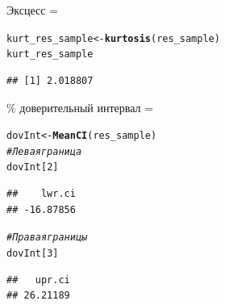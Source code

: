 \documentclass{article}\usepackage[]{graphicx}\usepackage[]{color}
\makeatletter
\newcommand{\hlnum}[1]{\textcolor[rgb]{0.686,0.059,0.569}{#1}}%
\newcommand{\hlcom}[1]{\textcolor[rgb]{0.678,0.584,0.686}{\textit{#1}}}%
\newcommand{\hlstd}[1]{\textcolor[rgb]{0.345,0.345,0.345}{#1}}%
\newcommand{\hlkwb}[1]{\textcolor[rgb]{0.69,0.353,0.396}{#1}}%
\newcommand{\hlkwd}[1]{\textcolor[rgb]{0.737,0.353,0.396}{\textbf{#1}}}%
\newenvironment{kframe}{%
 \def\at@end@of@kframe{}%
 \ifinner\ifhmode%
  \def\at@end@of@kframe{\end{minipage}}%
  \begin{minipage}{\columnwidth}%
 \fi\fi%
 \def\FrameCommand##1{\hskip\@totalleftmargin \hskip-\fboxsep
 \colorbox{shadecolor}{##1}\hskip-\fboxsep
     \hskip-\linewidth \hskip-\@totalleftmargin \hskip\columnwidth}%
 \MakeFramed {\advance\hsize-\width
   \@totalleftmargin\z@ \linewidth\hsize
   \@setminipage}}%
 {\par\unskip\endMakeFramed%
 \at@end@of@kframe}
\newenvironment{knitrout}{}{} %
\makeatother
\begin{document}
Эксцесс = 
\begin{knitrout}
\color{fgcolor}\begin{kframe}
\begin{alltt}
\hlstd{kurt_res_sample} \hlkwb{<-} \hlkwd{kurtosis}\hlstd{(res_sample)}
\hlstd{kurt_res_sample}
\end{alltt}
\begin{verbatim}
## [1] 2.018807
\end{verbatim}
\end{kframe}
\end{knitrout}
95\% доверительный интервал = 
\begin{knitrout}
\color{fgcolor}\begin{kframe}
\begin{alltt}
\hlstd{dovInt} \hlkwb{<-} \hlkwd{MeanCI}\hlstd{(res_sample)}
\hlcom{#Левая граница}
\hlstd{dovInt[}\hlnum{2}\hlstd{]}
\end{alltt}
\begin{verbatim}
##    lwr.ci 
## -16.87856
\end{verbatim}
\begin{alltt}
\hlcom{#Правая границы}
\hlstd{dovInt[}\hlnum{3}\hlstd{]}
\end{alltt}
\begin{verbatim}
##   upr.ci 
## 26.21189
\end{verbatim}
\end{kframe}
\end{knitrout}
\end{document}
